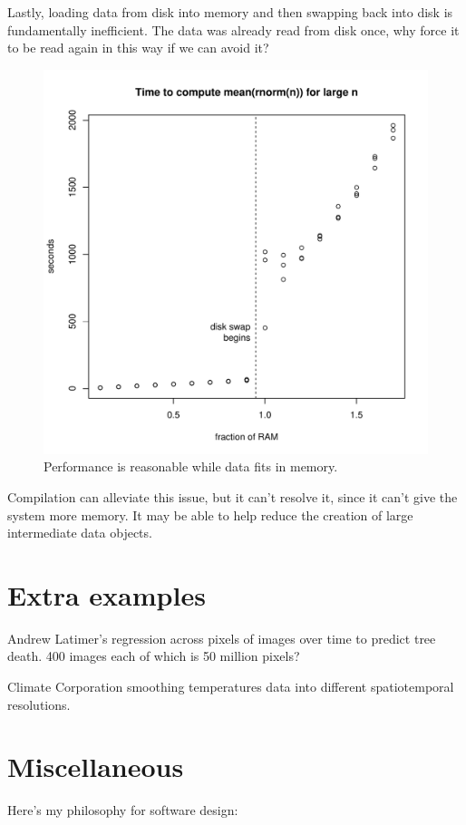 \documentclass[12pt]{article}
\begin{document}
Lastly, loading data from disk into memory and then swapping back into disk
is fundamentally inefficient. The data was already read from disk once, why force it
to be read again in this way if we can avoid it?

\begin{figure}
\centering
\includegraphics[width=.8\linewidth]{swap/spinning_disk_swap}
\caption{Performance is reasonable while data fits in memory.}
\label{fig:spinning_disk_swap}
\end{figure}

Compilation can alleviate this issue, but it can't resolve it, since it
can't give the system more memory. It may be able to help reduce the
creation of large intermediate data objects.


\section{Extra examples}

Andrew Latimer's regression across pixels of images over time to predict
tree death. 400 images each of which is 50 million pixels?

Climate Corporation smoothing temperatures data into different
spatiotemporal resolutions.

\section{Miscellaneous}

Here's my philosophy for software design:
\end{document}
